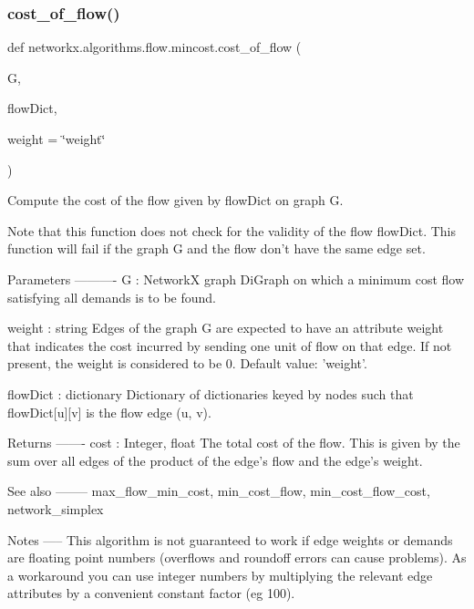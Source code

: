\subsubsection{\texorpdfstring{cost\+\_\+of\+\_\+flow()}{cost\_of\_flow()}}
{\footnotesize\ttfamily def networkx.\+algorithms.\+flow.\+mincost.\+cost\+\_\+of\+\_\+flow (\begin{DoxyParamCaption}\item[{}]{G,  }\item[{}]{flow\+Dict,  }\item[{}]{weight = {\ttfamily \char`\"{}weight\char`\"{}} }\end{DoxyParamCaption})}

\begin{DoxyVerb}Compute the cost of the flow given by flowDict on graph G.

Note that this function does not check for the validity of the
flow flowDict. This function will fail if the graph G and the
flow don't have the same edge set.

Parameters
----------
G : NetworkX graph
    DiGraph on which a minimum cost flow satisfying all demands is
    to be found.

weight : string
    Edges of the graph G are expected to have an attribute weight
    that indicates the cost incurred by sending one unit of flow on
    that edge. If not present, the weight is considered to be 0.
    Default value: 'weight'.

flowDict : dictionary
    Dictionary of dictionaries keyed by nodes such that
    flowDict[u][v] is the flow edge (u, v).

Returns
-------
cost : Integer, float
    The total cost of the flow. This is given by the sum over all
    edges of the product of the edge's flow and the edge's weight.

See also
--------
max_flow_min_cost, min_cost_flow, min_cost_flow_cost, network_simplex

Notes
-----
This algorithm is not guaranteed to work if edge weights or demands
are floating point numbers (overflows and roundoff errors can
cause problems). As a workaround you can use integer numbers by
multiplying the relevant edge attributes by a convenient
constant factor (eg 100).
\end{DoxyVerb}
 \mbox{\label{namespacenetworkx_1_1algorithms_1_1flow_1_1mincost_a25a42d78cf61bb03df04a91acc9484da}} 
